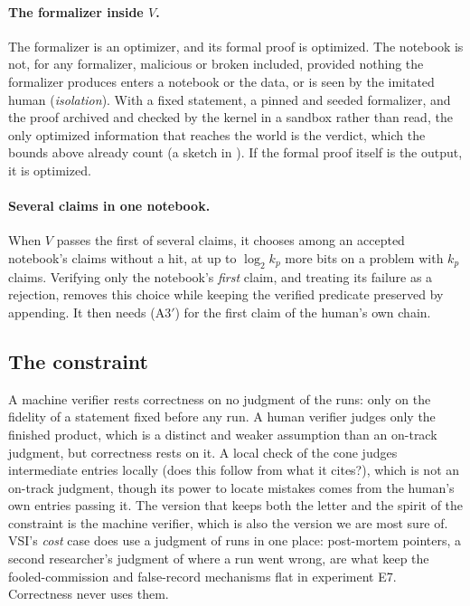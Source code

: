 \documentclass[11pt]{article}
\theoremstyle{definition}
\theoremstyle{remark}
\begin{document}
\paragraph{The formalizer inside $V$.} The formalizer is an optimizer, and its formal proof is optimized. The notebook is not, for any formalizer, malicious or broken included, provided nothing the formalizer produces enters a notebook or the data, or is seen by the imitated human (\emph{isolation}). With a fixed statement, a pinned and seeded formalizer, and the proof archived and checked by the kernel in a sandbox rather than read, the only optimized information that reaches the world is the verdict, which the bounds above already count (a sketch in \cite{threadV}). If the formal proof itself is the output, it is optimized.

\paragraph{Several claims in one notebook.} When $V$ passes the first of several claims, it chooses among an accepted notebook's claims without a hit, at up to $\log_2 k_p$ more bits on a problem with $k_p$ claims. Verifying only the notebook's \emph{first} claim, and treating its failure as a rejection, removes this choice while keeping the verified predicate preserved by appending. It then needs (A3$'$) for the first claim of the human's own chain.

\subsection{The constraint}
A machine verifier rests correctness on no judgment of the runs: only on the fidelity of a statement fixed before any run. A human verifier judges only the finished product, which is a distinct and weaker assumption than an on-track judgment, but correctness rests on it. A local check of the cone judges intermediate entries locally (does this follow from what it cites?), which is not an on-track judgment, though its power to locate mistakes comes from the human's own entries passing it. The version that keeps both the letter and the spirit of the constraint is the machine verifier, which is also the version we are most sure of. VSI's \emph{cost} case does use a judgment of runs in one place: post-mortem pointers, a second researcher's judgment of where a run went wrong, are what keep the fooled-commission and false-record mechanisms flat in experiment E7. Correctness never uses them.
\end{document}
